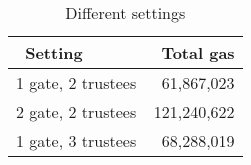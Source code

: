 
\begin{table}[t]
		\centering
	\begin{tabular}{|l|r|}
	\hline
	~\textbf{Setting}	& ~\textbf{Total gas}  \\ \hline
	1 gate, 2 trustees	& 61,867,023  \\ \hline
	2 gate, 2 trustees	&  121,240,622 \\ \hline
	1 gate, 3 trustees	& 68,288,019 \\ \hline
\end{tabular}
	\caption{Different settings}
	\label{tab:settings}
\end{table}